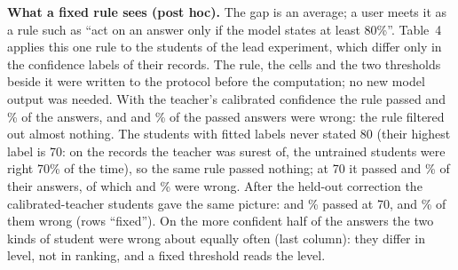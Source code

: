 \documentclass[10pt]{article}
\begin{document}
\begin{table}[h]
\centering\footnotesize
\caption{\textbf{Table 3. Result 3 across training seeds (trivia, sampled answer).} Students trained on the calibrated teacher's confidence (t-cal.) and on the same confidence labels shuffled across records (shuf.), same training seed, paired on the 1{,}000 test questions. Seed 1 is the pair of Section~4.3; the shuffled students of seeds 2 and 3 were trained after their predictions were registered. Shuffled: one fixed random permutation of the calibrated confidence labels over the \dTeacherKept{} records; every record keeps its question and answer, and the set of labels (so their mean and spread) is unchanged; \shMoved{} records got a different label. Whether an answer is right is not shuffled, only the label beside it: in the calibrated records the mean label was \shTcalRight{}\% on the teacher's right answers and \shTcalWrong{}\% on its wrong ones; after shuffling, \shShufRight{}\% and \shShufWrong{}\%. Says, Gap: the shuffled student's mean stated confidence and gap (it keeps the level). Source: \texttt{loopgain/rep.py} $\to$ \texttt{results/rep\_stats.json}.}
\tableRep
\end{table}

\textbf{What a fixed rule sees (post hoc).} The gap is an average; a user meets it as a rule such as ``act on an answer only if the model states at least 80\%''. Table~4 applies this one rule to the students of the lead experiment, which differ only in the confidence labels of their records. The rule, the cells and the two thresholds beside it were written to the protocol before the computation; no new model output was needed. With the teacher's calibrated confidence the rule passed \rQTcalPass{} and \rGTcalPass{}\% of the answers, and \rQTcalWrong{} and \rGTcalWrong{}\% of the passed answers were wrong: the rule filtered out almost nothing. The students with fitted labels never stated 80 (their highest label is 70: on the records the teacher was surest of, the untrained students were right 70\% of the time), so the same rule passed nothing; at 70 it passed \rQScalPassSeventy{} and \rGScalPassSeventy{}\% of their answers, of which \rQScalWrongSeventy{} and \rGScalWrongSeventy{}\% were wrong. After the held-out correction the calibrated-teacher students gave the same picture: \rQRecalPassSeventy{} and \rGRecalPassSeventy{}\% passed at 70, \rQRecalWrongSeventy{} and \rGRecalWrongSeventy{}\% of them wrong (rows ``fixed''). On the more confident half of the answers the two kinds of student were wrong about equally often (last column): they differ in level, not in ranking, and a fixed threshold reads the level.
\end{document}
